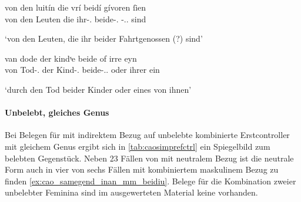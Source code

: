 \begin{exe}
\ex \label{ex:remgenbeide}
\begin{xlist}
	\ex \label{ex:remgenbeide_1}
		\gll von den luitín die vrí beidí gívoren ſien \\
			von den Leuten die ihr-\Gen.\Pl{} beide-\Gen.\Pl{}
			-\Nom.\Pl.\MascA{} sind
			\\
		\begin{taggedline}{\parencite[\nopp{}M320, 17\vo, 21--22]{rem}}
		\trans `von den Leuten, die ihr beider Fahrtgenossen (?) sind'
		\end{taggedline}

	\ex \label{ex:remgenbeide_2}
		\gll van dode der kindˢe beide of irre eyn \\
			von Tod-\Dat.\Sg{} der Kind-\Gen.\Pl{} beide-\Gen.\Pl.\St{} oder
			ihrer ein \\
		\begin{taggedline}{\parencite[\nopp{}M350, 5, 11]{rem}}
		\trans `durch den Tod beider Kinder oder eines von ihnen'
		\end{taggedline}
\end{xlist}
\end{exe}

\paragraph{Unbelebt, gleiches Genus}

Bei Belegen für  mit indirektem Bezug auf unbelebte kombinierte
Erstcontroller mit gleichem Genus ergibt sich in \cref{tab:caosimprefctrl} ein
Spiegelbild zum belebten Gegenstück. Neben 23 Fällen von  mit
neutralem Bezug ist die neutrale Form auch in vier von sechs Fällen mit
kombiniertem maskulinem Bezug zu finden \cref{ex:cao_samegend_inan_mm_beidiu}.
Belege für die Kombination zweier unbelebter Feminina sind im ausgewerteten
Material keine vorhanden.

